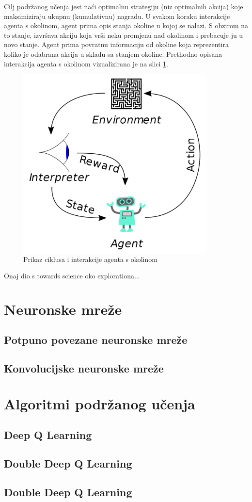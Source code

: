 Cilj podržanog učenja jest naći optimalnu strategiju (niz optimalnih akcija) koje maksimiziraju ukupnu (kumulativnu) nagradu. U svakom koraku interakcije agenta s okolinom, agent prima opis stanja okoline u kojoj se nalazi. S obzirom na to stanje, izvršava akciju koja vrši neku promjenu nad okolinom i prebacuje ju u novo stanje. Agent prima povratnu informaciju od okoline koja reprezentira koliko je odabrana akcija u skladu sa stanjem okoline. Prethodno opisana interakcija agenta s okolinom vizualizirana je na slici \ref{fig:rl}.

\begin{figure}[h]
    \centering
    \includegraphics[width=10cm]{assets/rl_diagram.png}
    \caption{Prikaz ciklusa i interakcije agenta s okolinom}
    \label{fig:rl}
\end{figure}

Onaj dio s towards science oko explorationa...


\section{Neuronske mreže}

\subsection{Potpuno povezane neuronske mreže}

\subsection{Konvolucijske neuronske mreže}

\section{Algoritmi podržanog učenja}

\subsection{Deep Q Learning}
\subsection{Double Deep Q Learning}
\subsection{Double Deep Q Learning}

